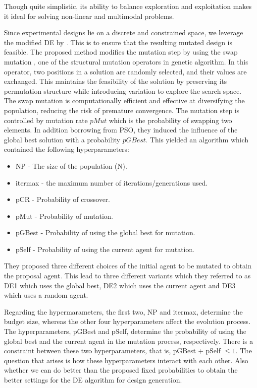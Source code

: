 \documentclass [PhD] {package/uclathes}
\begin{document}
Though quite simplistic, its ability to balance exploration and exploitation makes it ideal for solving non-linear and multimodal problems. 

Since experimental designs lie on a discrete and constrained space, we leverage the modified DE by \textcite{stokes2023metaheuristic}. This is to ensure that the resulting mutated design is feasible. The proposed method modifies the mutation step by using the swap mutation  \parencite{michalewicz2013genetic}, one of the structural mutation operators in genetic algorithm.  In this operator, two positions in a solution are randomly selected, and their values are exchanged. This maintains the feasibility of the solution by preserving its permutation structure while introducing variation to explore the search space. The swap mutation is computationally efficient and effective at diversifying the population, reducing the risk of premature convergence. The mutation step is controlled by mutation rate $pMut$ which is the probability of swapping two elements. In addition borrowing from PSO, they induced the influence of the global best solution with a probability $pGBest$. This yielded an algorithm which contained the following hyperparameters:
\begin{itemize}
    \item NP - The size of the population (N). %
    \item itermax -  the maximum number of iterations/generations used. %
    \item pCR - Probability of crossover. %
    \item pMut - Probability of mutation. %
    \item pGBest - Probability of using the global best for mutation.
    \item pSelf - Probability of using the current agent for mutation.
\end{itemize}

They proposed three different choices of the initial agent to be mutated to obtain the proposal agent. This lead to three different variants which they referred to as DE1 which uses the global best, DE2 which uses the current agent and DE3 which uses a random agent.  

Regarding the hypermarameters, the first two, NP and itermax, determine the budget size, whereas the other four hyperparameters affect the evolution process. The hyperparameters, pGBest and pSelf, determine the probability of using the global best and the current agent in the mutation process, respectively. There is a constraint between these two hyperparameters, that is, pGBest + pSelf $\le 1$. The question that arises is how these hyperparameters interact with each other. Also whether we can do better than the proposed fixed probabilities to obtain the better settings for the DE algorithm for design generation.
\end{document}
